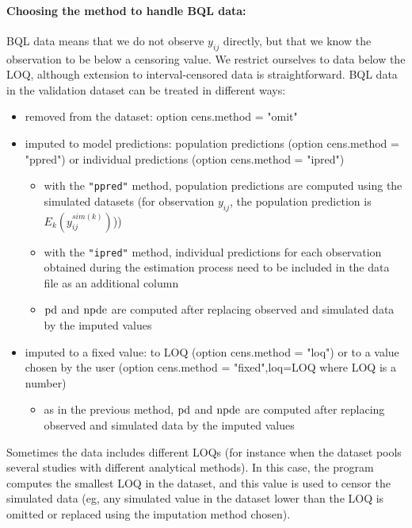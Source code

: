 \paragraph{Choosing the method to handle BQL data:} BQL data means that we do not observe $y_{ij}$ directly, but that we know the observation to be below a censoring value. We restrict ourselves to data below the LOQ, although extension to interval-censored data is straightforward. BQL data in the validation dataset can be treated in different ways:
\begin{itemize}
\item removed from the dataset: option {\sf cens.method = "omit"}
\item imputed to model predictions: population predictions (option {\sf cens.method = "ppred"}) or individual predictions (option {\sf cens.method = "ipred"})
   \begin{itemize}
   \item with the \texttt{"ppred"} method, population predictions are computed using the simulated datasets (for observation $y_{ij}$, the population prediction is $E_k(y^{sim(k)}_{ij})$))
   \item with the \texttt{"ipred"} method, individual predictions for each observation obtained during the estimation process need to be included in the data file as an additional column
   \item ${\rm pd}$ and ${\rm npde}$ are computed after replacing observed and simulated data by the imputed values
   \end{itemize}
\item imputed to a fixed value: to LOQ (option {\sf cens.method = "loq"}) or to a value chosen by the user (option {\sf cens.method = "fixed",loq=LOQ} where LOQ is a number)
   \begin{itemize}
   \item as in the previous method, ${\rm pd}$ and ${\rm npde}$ are computed after replacing observed and simulated data by the imputed values
   \end{itemize}
\end{itemize}
Sometimes the data includes different LOQs (for instance when the dataset pools several studies with different analytical methods). In this case, the program computes the smallest LOQ in the dataset, and this value is used to censor the simulated data (eg, any simulated value in the dataset lower than the LOQ is omitted or replaced using the imputation method chosen).

